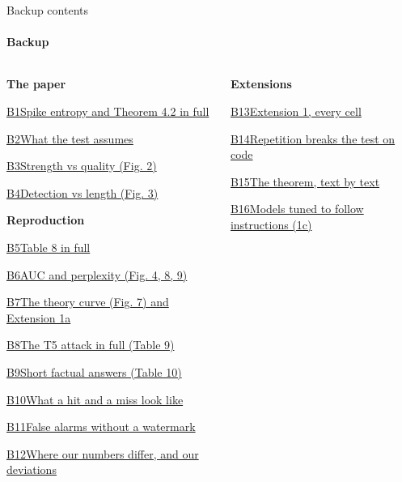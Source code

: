 \documentclass[aspectratio=169,10pt,t]{beamer}
\newcommand{\key}[1]{\textcolor{calblue}{\textbf{#1}}}
\begin{document}
\begin{frame}[label=b0]{Backup contents}
  \framesubtitle{Backup}
  \small
  \begin{columns}[T,onlytextwidth]
    \begin{column}{0.48\textwidth}
      \key{The paper}\par\vspace{0.15em}
      \hyperlink{b1}{B1\quad Spike entropy and Theorem 4.2 in full}\par
      \hyperlink{b2}{B2\quad What the test assumes}\par
      \hyperlink{b3}{B3\quad Strength vs quality (Fig. 2)}\par
      \hyperlink{b4}{B4\quad Detection vs length (Fig. 3)}\par
      \vspace{0.6em}
      \key{Reproduction}\par\vspace{0.15em}
      \hyperlink{b5}{B5\quad Table 8 in full}\par
      \hyperlink{b6}{B6\quad AUC and perplexity (Fig. 4, 8, 9)}\par
      \hyperlink{b7}{B7\quad The theory curve (Fig. 7) and Extension 1a}\par
      \hyperlink{b8}{B8\quad The T5 attack in full (Table 9)}\par
      \hyperlink{b9}{B9\quad Short factual answers (Table 10)}\par
      \hyperlink{b10}{B10\quad What a hit and a miss look like}\par
      \hyperlink{b11}{B11\quad False alarms without a watermark}\par
      \hyperlink{b12}{B12\quad Where our numbers differ, and our deviations}\par
    \end{column}
    \begin{column}{0.48\textwidth}
      \key{Extensions}\par\vspace{0.15em}
      \hyperlink{b13}{B13\quad Extension 1, every cell}\par
      \hyperlink{b14}{B14\quad Repetition breaks the test on code}\par
      \hyperlink{b15}{B15\quad The theorem, text by text}\par
      \hyperlink{b16}{B16\quad Models tuned to follow instructions (1c)}\par

\end{column}
\end{columns}
\end{frame}
\end{document}
